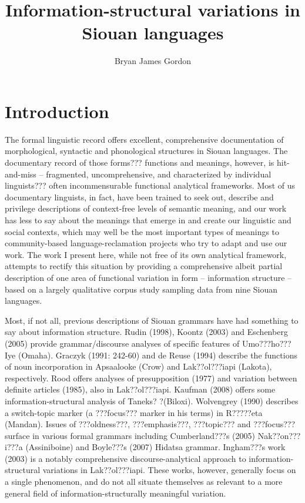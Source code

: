 \documentclass[output=paper]{LSP/langsci}
\author{Bryan James Gordon}
\title{Information-structural variations in Siouan languages}
\begin{document}
\section{Introduction}

	The formal linguistic record offers excellent, comprehensive documentation of morphological, syntactic and phonological structures in Siouan languages. The documentary record of those forms??? functions and meanings, however, is hit-and-miss -- fragmented, uncomprehensive, and characterized by individual linguists??? often incommensurable functional analytical frameworks. Most of us documentary linguists, in fact, have been trained to seek out, describe and privilege descriptions of context-free levels of semantic meaning, and our work has less to say about the meanings that emerge in and create our linguistic and social contexts, which may well be the most important types of meanings to community-based language-reclamation projects who try to adapt and use our work. The work I present here, while not free of its own analytical framework, attempts to rectify this situation by providing a comprehensive albeit partial description of one area of functional variation in form -- information structure -- based on a largely qualitative corpus study sampling data from nine Siouan languages.
	
	Most, if not all, previous descriptions of Siouan grammars have had something to say about information structure. Rudin (1998), Koontz (2003) and Eschenberg (2005) provide grammar/discourse analyses of specific features of Umo???ho??? Iye (Omaha). Graczyk (1991: 242-60) and de Reuse (1994) describe the functions of noun incorporation in Apsaalooke (Crow) and Lak??ol???iapi (Lakota), respectively. Rood offers analyses of presupposition (1977) and variation between definite articles (1985), also in Lak??ol???iapi. Kaufman (2008) offers some information-structural analysis of Taneks? ?(Biloxi). Wolvengrey (1990) describes a switch-topic marker (a ???focus??? marker in his terms) in R?????eta (Mandan). Issues of ???oldness???, ???emphasis???, ???topic??? and ???focus??? surface in various formal grammars including Cumberland???s (2005) Nak??on???i???a (Assiniboine) and Boyle???s (2007) Hidatsa grammar. Ingham???s work (2003) is a notably comprehensive discourse-analytical approach to information-structural variations in La\-k??ol\-???ia\-pi. These works, however, generally focus on a single phenomenon, and do not all situate themselves as relevant to a more general field of information-structurally meaningful variation. 
	
\end{document}
